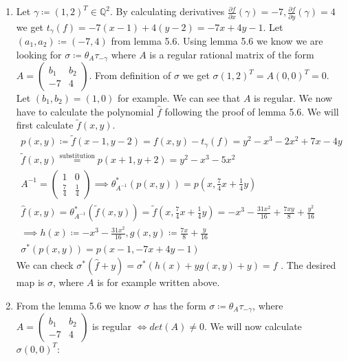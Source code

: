 \documentclass[12pt, a4paper]{article}
\begin{document}
\section{}
\begin{enumerate}[label=(\alph*)]
\item Let $\gamma \coloneqq (1,2)^T \in \mathbb{Q}^2$. By calculating derivatives $\frac{\partial f}{\partial x} (\gamma) = -7, \frac{\partial f}{\partial y} (\gamma) = 4$ we get $t_{\gamma}(f) = -7(x-1)+4(y-2) = -7x+4y-1$. Let $(a_1,a_2) \coloneqq (-7,4)$ from lemma 5.6. Using lemma 5.6 we know we are looking for $\sigma \coloneqq \theta_A \tau_{-\gamma}$ where $A$ is a regular rational matrix of the form $A = \begin{pmatrix}b_1 & b_2 \\ -7 & 4\end{pmatrix}$. From definition of $\sigma$ we get $\sigma(1,2)^T = A(0,0)^T = 0$.\\
Let $(b_1,b_2)=(1,0)$ for example. We can see that $A$ is regular. We now have to calculate the polynomial $\hat{f}$ following the proof of lemma 5.6. We will first calculate $\tilde{f}(x,y)$.
\begin{gather*}
p(x,y) \coloneqq \tilde{f}(x-1,y-2) = f(x,y)-t_\gamma(f)= y^2-x^3-2x^2+7x-4y\\
\tilde{f}(x,y) \stackrel{\text{substitution}}{=} p(x+1,y+2) = y^2-x^3-5x^2\\
A^{-1} = \begin{pmatrix}
1 & 0\\
\frac{7}{4} & \frac{1}{4}
\end{pmatrix} \implies \theta_{A^{-1}}^*(p(x,y)) = p(x, \frac{7}{4}x+\frac{1}{4}y)\\
\hat{f}(x,y) = \theta_{A^{-1}}^*(\tilde{f}(x,y))=\tilde{f}(x, \frac{7}{4}x+\frac{1}{4}y) = -x^3-\frac{31 x^2}{16}+\frac{7 x y}{8}+\frac{y^2}{16}\\
\implies h(x)\coloneqq -x^3-\frac{31 x^2}{16}, g(x,y) \coloneqq \frac{7 x}{8}+\frac{y}{16}\\
\sigma^*(p(x,y)) = p(x-1, -7x+4y-1)
\end{gather*}
We can check $\sigma^*(\hat{f}+y) = \sigma^*(h(x)+yg(x,y)+y) =  f$ . The desired map is $\sigma$, where $A$ is for example written above.
\item From the lemma 5.6 we know $\sigma$ has the form $\sigma \coloneqq \theta_A \tau_{-\gamma}$, where $A = \begin{pmatrix}b_1 & b_2 \\ -7 & 4\end{pmatrix}$ is regular $\iff det(A) \neq 0$. We will now calculate $\sigma(0,0)^T:$

\end{enumerate}
\end{document}
